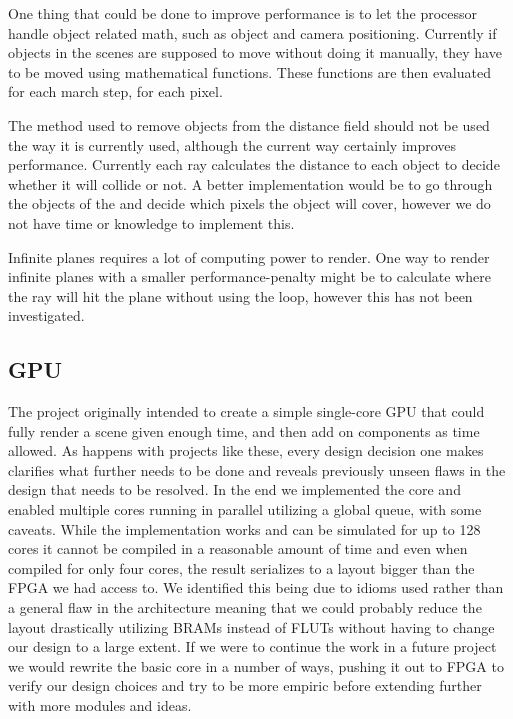 			One thing that could be done to improve performance is to let the
			processor handle object related math, such as object and camera 
			positioning. Currently if objects in the scenes are supposed to 
			move without doing it manually, they have to be moved using 
			mathematical functions. These functions are then evaluated for 
			each march step, for each pixel.

			The method used to remove objects from the distance field should
			not be used the way it is currently used, although the current way
			certainly improves performance. Currently each ray calculates the
			distance to each object to decide whether it will collide or not. 
			A better implementation would be to go through the objects of the 
			and decide which pixels the object will cover, however we do not
			have time or knowledge to implement this. 

			Infinite planes requires a lot of computing power to render. One 
			way to render infinite planes with a smaller performance-penalty 
			might be to calculate where the ray will hit the plane without 
			using the loop, however this has not been investigated. 


		
		\subsection{GPU} 
		
			The project originally intended to create a simple single-core GPU that
			could fully render a scene given enough time, and then add on components
			as time allowed. As happens with projects like these, every design
			decision one makes clarifies what further needs to be done and reveals
			previously unseen flaws in the design that needs to be resolved. In the
			end we implemented the core and enabled multiple cores running in
			parallel utilizing a global queue, with some caveats. While the
			implementation works and can be simulated for up to 128 cores it cannot
			be compiled in a reasonable amount of time and even when compiled for
			only four cores, the result serializes to a layout bigger than the FPGA
			we had access to. We identified this being due to idioms used rather than
			a general flaw in the architecture meaning that we could probably reduce
			the layout drastically utilizing BRAMs instead of FLUTs without having to
			change our design to a large extent. If we were to continue the work in a
			future project we would rewrite the basic core in a number of ways,
			pushing it out to FPGA to verify our design choices and try to be more
			empiric before extending further with more modules and ideas. 
